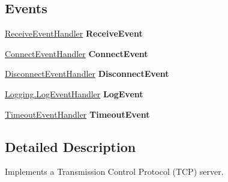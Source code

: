 \subsection*{Events}
\begin{DoxyCompactItemize}
\item 
\hypertarget{classAsterion_1_1Server_a86e70015d1cbdbb93aec3e752d6f457a}{\hyperlink{namespaceAsterion_a5ef58966894a2b631dc841b7cdd1a5e2}{Receive\-Event\-Handler} {\bfseries Receive\-Event}}\label{classAsterion_1_1Server_a86e70015d1cbdbb93aec3e752d6f457a}

\item 
\hypertarget{classAsterion_1_1Server_a0756512539b44fc1a57b6dac1bdca1be}{\hyperlink{namespaceAsterion_aa915f460db30cba69c8c917d94da98e8}{Connect\-Event\-Handler} {\bfseries Connect\-Event}}\label{classAsterion_1_1Server_a0756512539b44fc1a57b6dac1bdca1be}

\item 
\hypertarget{classAsterion_1_1Server_a9a39e5289a373e7f5d727cad96f69a0a}{\hyperlink{namespaceAsterion_a96f853b30e28b18bf4afa727d5f144e0}{Disconnect\-Event\-Handler} {\bfseries Disconnect\-Event}}\label{classAsterion_1_1Server_a9a39e5289a373e7f5d727cad96f69a0a}

\item 
\hypertarget{classAsterion_1_1Server_aa8099aa7ba7bcc1c4b5519ca9cf9c549}{\hyperlink{namespaceAsterion_1_1Logging_afaa8d5b6776c6635522846d7f2751ca9}{Logging.\-Log\-Event\-Handler} {\bfseries Log\-Event}}\label{classAsterion_1_1Server_aa8099aa7ba7bcc1c4b5519ca9cf9c549}

\item 
\hypertarget{classAsterion_1_1Server_ae7e3538c394854a30299f7c2205ba825}{\hyperlink{namespaceAsterion_a5083085ed7d41e00c1ecce1efcd5a096}{Timeout\-Event\-Handler} {\bfseries Timeout\-Event}}\label{classAsterion_1_1Server_ae7e3538c394854a30299f7c2205ba825}

\end{DoxyCompactItemize}


\subsection{Detailed Description}
Implements a Transmission Control Protocol (T\-C\-P) server. 

